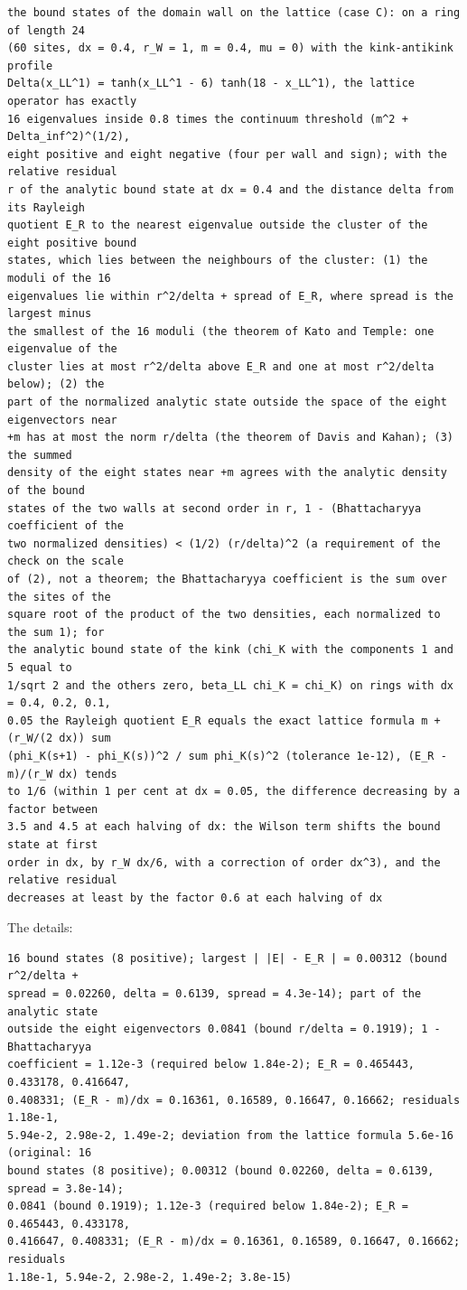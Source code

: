 \documentclass[
  10pt,
]{article}
\begin{document}
\begin{verbatim}
the bound states of the domain wall on the lattice (case C): on a ring of length 24
(60 sites, dx = 0.4, r_W = 1, m = 0.4, mu = 0) with the kink-antikink profile
Delta(x_LL^1) = tanh(x_LL^1 - 6) tanh(18 - x_LL^1), the lattice operator has exactly
16 eigenvalues inside 0.8 times the continuum threshold (m^2 + Delta_inf^2)^(1/2),
eight positive and eight negative (four per wall and sign); with the relative residual
r of the analytic bound state at dx = 0.4 and the distance delta from its Rayleigh
quotient E_R to the nearest eigenvalue outside the cluster of the eight positive bound
states, which lies between the neighbours of the cluster: (1) the moduli of the 16
eigenvalues lie within r^2/delta + spread of E_R, where spread is the largest minus
the smallest of the 16 moduli (the theorem of Kato and Temple: one eigenvalue of the
cluster lies at most r^2/delta above E_R and one at most r^2/delta below); (2) the
part of the normalized analytic state outside the space of the eight eigenvectors near
+m has at most the norm r/delta (the theorem of Davis and Kahan); (3) the summed
density of the eight states near +m agrees with the analytic density of the bound
states of the two walls at second order in r, 1 - (Bhattacharyya coefficient of the
two normalized densities) < (1/2) (r/delta)^2 (a requirement of the check on the scale
of (2), not a theorem; the Bhattacharyya coefficient is the sum over the sites of the
square root of the product of the two densities, each normalized to the sum 1); for
the analytic bound state of the kink (chi_K with the components 1 and 5 equal to
1/sqrt 2 and the others zero, beta_LL chi_K = chi_K) on rings with dx = 0.4, 0.2, 0.1,
0.05 the Rayleigh quotient E_R equals the exact lattice formula m + (r_W/(2 dx)) sum
(phi_K(s+1) - phi_K(s))^2 / sum phi_K(s)^2 (tolerance 1e-12), (E_R - m)/(r_W dx) tends
to 1/6 (within 1 per cent at dx = 0.05, the difference decreasing by a factor between
3.5 and 4.5 at each halving of dx: the Wilson term shifts the bound state at first
order in dx, by r_W dx/6, with a correction of order dx^3), and the relative residual
decreases at least by the factor 0.6 at each halving of dx
\end{verbatim}

The details:

\begin{verbatim}
16 bound states (8 positive); largest | |E| - E_R | = 0.00312 (bound r^2/delta +
spread = 0.02260, delta = 0.6139, spread = 4.3e-14); part of the analytic state
outside the eight eigenvectors 0.0841 (bound r/delta = 0.1919); 1 - Bhattacharyya
coefficient = 1.12e-3 (required below 1.84e-2); E_R = 0.465443, 0.433178, 0.416647,
0.408331; (E_R - m)/dx = 0.16361, 0.16589, 0.16647, 0.16662; residuals 1.18e-1,
5.94e-2, 2.98e-2, 1.49e-2; deviation from the lattice formula 5.6e-16 (original: 16
bound states (8 positive); 0.00312 (bound 0.02260, delta = 0.6139, spread = 3.8e-14);
0.0841 (bound 0.1919); 1.12e-3 (required below 1.84e-2); E_R = 0.465443, 0.433178,
0.416647, 0.408331; (E_R - m)/dx = 0.16361, 0.16589, 0.16647, 0.16662; residuals
1.18e-1, 5.94e-2, 2.98e-2, 1.49e-2; 3.8e-15)
\end{verbatim}
\end{document}
